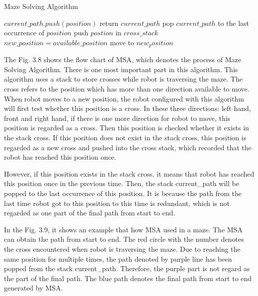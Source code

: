 \documentclass[11pt,times,oneside,openright,hardcopy]{eeereport}
\begin{document}
\begin{algorithm}
    \caption{Maze Solving Algorithm}
    \begin{algorithmic}[1]
       \State $current\_path.push(position)$
                \State return $current\_path$
            \Else
                        \State pop $current\_path$ to the last occurrence of $position$
                    \Else
                        \State push $postion$ in $cross\_stack$
                    \EndIf
                \State $new\_position = available\_position$
                \State move to $new_position$
                \EndIf  
            \EndIf
    \EndProcedure
\end{algorithmic}
\end{algorithm}
The Fig. 3.8 shows the flow chart of MSA, which denotes the process of Maze Solving Algorithm.
There is one most important part in this algorithm. This algorithm uses a stack to store crosses while robot is traversing the maze.
The cross refers to the position which has more than one direction available to move. When robot moves to a new position,
the robot configured with this algorithm will first test whether this position is a cross. In these three directions: left hand, front and right hand,
if there is one more direction for robot to move, this position is regarded as a cross. Then this position is checked whether it exists in the stack cross.
If this position does not exist in the stack cross, this position is regarded as a new cross and pushed into the cross stack, which recorded that the robot has reached this position once.


However, if this position exists in the stack cross, it means that robot has reached this position once in the previous time. 
Then, the stack current\_path will be popped to the last occurrence of this position. It is because the path from the last time robot got to this position to this time is redundant,
which is not regarded as one part of the final path from start to end.

\newpage
In the Fig. 3.9, it shows an example that how MSA used in a maze.
The MSA can obtain the path from start to end. The red circle with the number denotes the cross encountered when robot is traversing the maze.
Due to reaching the same position for multiple times, the path denoted by purple line has been popped from the stack current\_path. Therefore, the purple part is not regard as the part of the final path.
The blue path denotes the final path from start to end generated by MSA.
\end{document}
